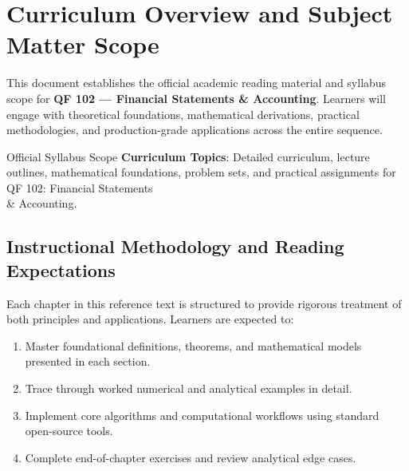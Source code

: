 \section{Curriculum Overview and Subject Matter Scope}

This document establishes the official academic reading material and syllabus scope for \textbf{QF 102 --- Financial Statements \& Accounting}. Learners will engage with theoretical foundations, mathematical derivations, practical methodologies, and production-grade applications across the entire sequence.

\begin{InsightBox}{Official Syllabus Scope}
  \textbf{Curriculum Topics}: Detailed curriculum, lecture outlines, mathematical foundations, problem sets, and practical assignments for QF 102: Financial Statements \\& Accounting.
\end{InsightBox}

\subsection{Instructional Methodology and Reading Expectations}

Each chapter in this reference text is structured to provide rigorous treatment of both principles and applications. Learners are expected to:
\begin{enumerate}
  \item Master foundational definitions, theorems, and mathematical models presented in each section.
  \item Trace through worked numerical and analytical examples in detail.
  \item Implement core algorithms and computational workflows using standard open-source tools.
  \item Complete end-of-chapter exercises and review analytical edge cases.
\end{enumerate}

